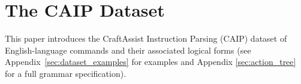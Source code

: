 \section{The CAIP Dataset}
\label{sec:data}

This paper introduces the CraftAssist Instruction Parsing (CAIP) dataset of English-language commands and their associated logical forms (see Appendix~\ref{sec:dataset_examples} for examples and Appendix \ref{sec:action_tree} for a full grammar specification).  

